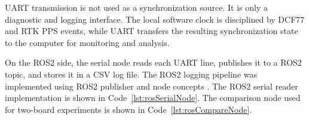 UART transmission is not used as a synchronization source. It is only a diagnostic and logging interface. The local software clock is disciplined by DCF77 and RTK PPS events, while UART transfers the resulting synchronization state to the computer for monitoring and analysis.

On the ROS2 side, the serial node reads each UART line, publishes it to a ROS2 topic, and stores it in a CSV log file. The ROS2 logging pipeline was implemented using ROS2 publisher and node concepts \cite{ros2Docs}. The ROS2 serial reader implementation is shown in Code~\ref{lst:rosSerialNode}. The comparison node used for two-board experiments is shown in Code~\ref{lst:rosCompareNode}.